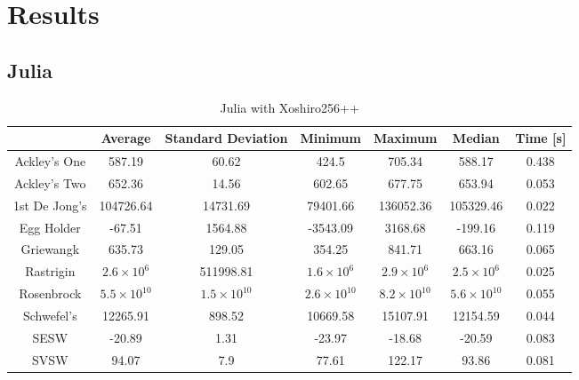 \documentclass{article}
\begin{document}
    \section{Results}

        \subsection{Julia}

            \begin{table}[h]
            \begin{centering}
                \begin{tabular}{c|c|c|c|c|c|c}
                                & Average & Standard Deviation & Minimum & Maximum & Median & Time [s] \\
                    \hline
                    Ackley's One & 587.19 & 60.62 & 424.5 & 705.34 & 588.17 & 0.438 \\
                    \hline
                    Ackley's Two & 652.36 & 14.56 & 602.65 & 677.75 & 653.94 & 0.053 \\
                    \hline
                    1st De Jong's & 104726.64 & 14731.69 & 79401.66 & 136052.36 & 105329.46 & 0.022 \\
                    \hline
                    Egg Holder & -67.51 & 1564.88 & -3543.09 & 3168.68 & -199.16 & 0.119 \\
                    \hline
                    Griewangk & 635.73 & 129.05 & 354.25 & 841.71 & 663.16 & 0.065 \\
                    \hline
                    Rastrigin & $2.6 \times 10^{6}$ & 511998.81 & $1.6 \times 10^6$ & $2.9 \times 10^6$ & $2.5 \times 10^6$ & 0.025 \\
                    \hline
                    Rosenbrock & $5.5 \times 10^{10}$ & $1.5 \times 10^{10}$ & $2.6 \times 10^{10}$ & $8.2 \times 10^{10}$ & $5.6 \times 10^{10}$ & 0.055 \\
                    \hline
                    Schwefel's & 12265.91 & 898.52 & 10669.58 & 15107.91 & 12154.59 & 0.044 \\
                    \hline
                    SESW & -20.89 & 1.31 & -23.97 & -18.68 & -20.59 & 0.083 \\
                    \hline
                    SVSW & 94.07 & 7.9 & 77.61 & 122.17 & 93.86 & 0.081 \\
                \end{tabular}
                \caption{Julia with Xoshiro256++}
            \end{centering}
            \end{table}
\end{document}
